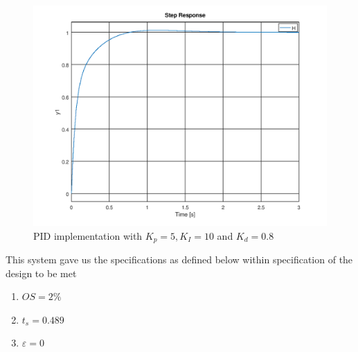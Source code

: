\documentclass[a4paper, 12pt]{article}
\begin{document}
\begin{figure}[H]
	\centering
	\includegraphics[width=\textwidth]{Images/question_4_PID.png}
	\caption{PID implementation with $K_p = 5, K_I = 10$ and $K_d = 0.8$}
	\label{fig:question_4_pid}
\end{figure}

This system gave us the specifications as defined below within specification of
the design to be met
\begin{enumerate}
	\item $OS = 2\%$
	\item $t_s = 0.489$
	\item $\varepsilon = 0$
\end{enumerate}


\end{document}
